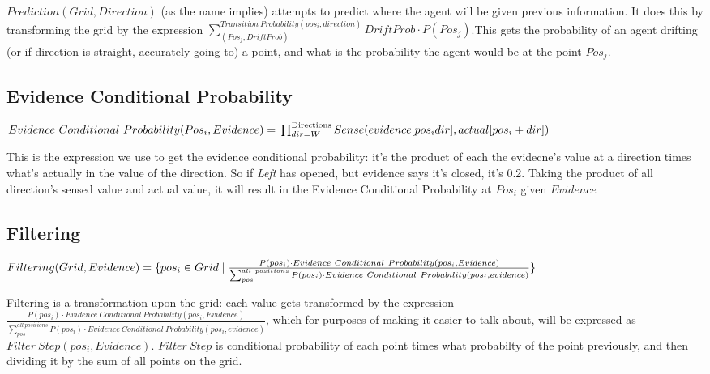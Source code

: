 \documentclass[11pt]{article}
\begin{document}
\(Prediction(Grid, Direction)\) (as the name implies) attempts to predict where the agent will be given previous information. It does this by transforming the grid by the expression  \(\sum^{Transition\ Probability(pos_i, direction)}_{(Pos_j, DriftProb)} DriftProb \cdot P(Pos_j)\).This gets the probability of an agent drifting (or if direction is straight, accurately going to) a point, and what is the probability the agent would be at the point \(Pos_j\).


\subsection*{Evidence Conditional Probability}
\label{sec:org7e2fa92}
   \begin{math}
  Evidence\ Conditional\ Probability(Pos_i, Evidence)= \\
  \prod^{\text{Directions} }_{dir=W} Sense(evidence[pos_i dir], actual[pos_i+dir])
\end{math}

This is the expression we use to get the evidence conditional probability: it's the product of each the evidecne's value at a direction times what's actually in the value of the direction. So if \emph{Left} has opened, but evidence says it's closed, it's 0.2. Taking the product of all direction's sensed value and actual value, it will result in the Evidence Conditional Probability at \(Pos_i\) given \(Evidence\)

\subsection*{Filtering}
\label{sec:org2604945}


   \begin{math}
Filtering(Grid, Evidence) = \{pos_i \in Grid \mid\\
\frac{P(pos_i) \cdot Evidence\ Conditional\ Probability(pos_i, Evidence) }{\sum^{all\ positions}_{pos} P(pos_i) \cdot Evidence\ Conditional\ Probability(pos_i, evidence) } \}
\end{math}



Filtering is a transformation upon the grid: each value gets transformed by the expression \(\frac{P(pos_i) \cdot Evidence\ Conditional\ Probability(pos_i, Evidence) }{\sum^{all\ positions}_{pos} P(pos_i) \cdot Evidence\ Conditional\ Probability(pos_i, evidence) }\), which for purposes of making it easier to talk about, will be expressed as \(Filter\ Step(pos_i, Evidence)\). \(Filter\ Step\) is conditional probability of each point times what probabilty of the  point previously, and then dividing it  by the sum of all points on the grid. 
\end{document}
